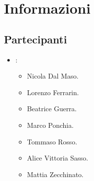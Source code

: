 \section{Informazioni}
\subsection{Partecipanti}

\begin{itemize}
	\item \GroupName:
	\begin{itemize}
		\item Nicola Dal Maso.
		\item Lorenzo Ferrarin.
		\item Beatrice Guerra.
		\item Marco Ponchia.
		\item Tommaso Rosso.
		\item Alice Vittoria Sasso.
		\item Mattia Zecchinato.
	\end{itemize}
\end{itemize}

\clearpage
